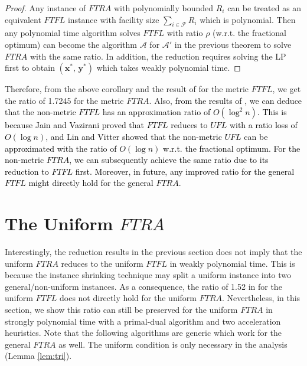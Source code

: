 \documentclass[10pt]{llncs}
\begin{document}
\begin{proof}
Any instance of $FTRA$ with polynomially bounded $R_{i}$ can be
treated as an equivalent $FTFL$ instance with facility size $\sum_{i\in\mathcal{F}}R_{i}$
which is polynomial. Then any polynomial time algorithm solves $FTFL$
with ratio $\rho$ (w.r.t. the fractional optimum) can become the
algorithm $\mathcal{A}$ for $\mathcal{A}'$ in the previous theorem
to solve $FTRA$ with the same ratio. In addition, the reduction requires
solving the LP first to obtain $\left(\boldsymbol{x^{*}},\,\boldsymbol{y^{*}}\right)$
which takes weakly polynomial time.
\end{proof}
Therefore, from the above corollary and the result of \cite{JaroslawFTFL1.725}
for the metric $FTFL$, we get the ratio of 1.7245 for the metric
$FTRA$. Also, \textcolor{black}{from the results of \cite{Jain00FTFL,Lin92filting},
we can deduce that the non-metric $FTFL$ has an approximation ratio
of $O\left(\log^{2}n\right)$. This is because Jain and Vazirani \cite{Jain00FTFL}
proved that $FTFL$ reduces to $UFL$ with a ratio loss of $O\left(\log n\right)$,
and Lin and Vitter \cite{Lin92filting} showed that the non-metric
$UFL$ can be approximated with the ratio of $O\left(\log n\right)$
w.r.t. the fractional optimum. For the non-metric $FTRA$, we can
subsequently achieve the same ratio due to its reduction to $FTFL$
first. Moreover, in future, any improved ratio for the general $FTFL$
might directly hold for the general $FTRA$.}


\section{The Uniform $FTRA$}

Interestingly, the reduction results in the previous section does
not imply that the uniform $FTRA$ reduces to the uniform $FTFL$
in weakly polynomial time. This is because the instance shrinking
technique may split a uniform instance into two general/non-uniform
instances. As a consequence, the ratio of 1.52 in \cite{Swamy08FTFL2.076}
for the uniform $FTFL$ does not directly hold for the uniform $FTRA$.
Nevertheless, in this section, we show this ratio can still be preserved
for the uniform $FTRA$ in strongly polynomial time with a primal-dual
algorithm and two acceleration heuristics. Note that the following
algorithms are generic which work for the general $FTRA$ as well.
The uniform condition is only necessary in the analysis (Lemma \ref{lem:tri}). 
\end{document}

